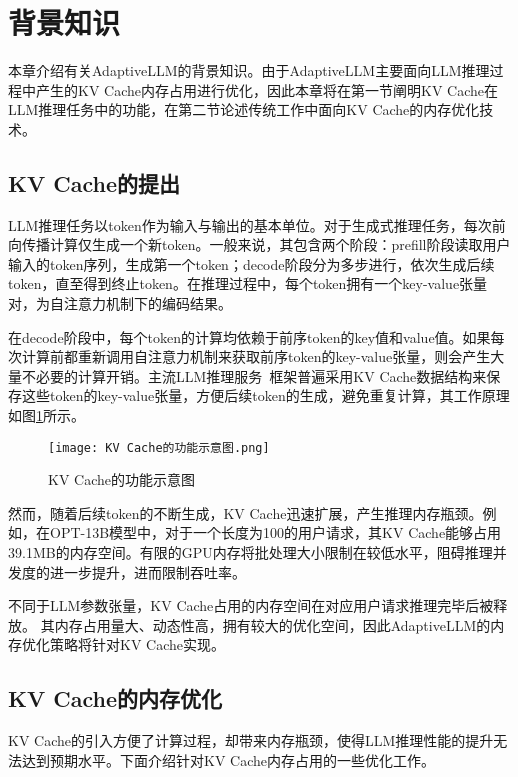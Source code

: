 \section{背景知识}

本章介绍有关AdaptiveLLM的背景知识。由于AdaptiveLLM主要面向LLM推理过程中产生的KV Cache内存占用进行优化，因此本章将在第一节阐明KV Cache在LLM推理任务中的功能，在第二节论述传统工作中面向KV Cache的内存优化技术。

\subsection{KV Cache的提出}

LLM推理任务以token作为输入与输出的基本单位。对于生成式推理任务，每次前向传播计算仅生成一个新token。一般来说，其包含两个阶段：prefill阶段读取用户输入的token序列，生成第一个token；decode阶段分为多步进行，依次生成后续token，直至得到终止token。在推理过程中，每个token拥有一个key-value张量对，为自注意力机制下的编码结果。

在decode阶段中，每个token的计算均依赖于前序token的key值和value值。如果每次计算前都重新调用自注意力机制来获取前序token的key-value张量，则会产生大量不必要的计算开销。主流LLM推理服务~\cite{Swapping, vLLM, ORCA, SpecInfer}框架普遍采用KV Cache数据结构来保存这些token的key-value张量，方便后续token的生成，避免重复计算，其工作原理如图\ref{Fig:KV Cache的功能示意图}所示。

\begin{figure}[!htbp]
  \centering
  \texttt{[image: KV Cache的功能示意图.png]}
  \caption{KV Cache的功能示意图}
  \label{Fig:KV Cache的功能示意图}
\end{figure}

然而，随着后续token的不断生成，KV Cache迅速扩展，产生推理内存瓶颈。例如，在OPT-13B模型中，对于一个长度为100的用户请求，其KV Cache能够占用39.1MB的内存空间。有限的GPU内存将批处理大小限制在较低水平，阻碍推理并发度的进一步提升，进而限制吞吐率。

不同于LLM参数张量，KV Cache占用的内存空间在对应用户请求推理完毕后被释放。 其内存占用量大、动态性高，拥有较大的优化空间，因此AdaptiveLLM的内存优化策略将针对KV Cache实现。

\subsection{KV Cache的内存优化}

KV Cache的引入方便了计算过程，却带来内存瓶颈，使得LLM推理性能的提升无法达到预期水平。下面介绍针对KV Cache内存占用的一些优化工作。

